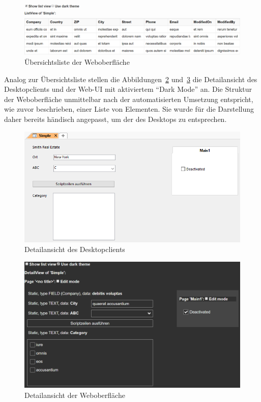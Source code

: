 \begin{figure}
    \centering
    \captionsetup{justification=centering}
    \includegraphics[width=\textwidth]{figures/listview_new.png}
        \caption{Übersichtsliste der Weboberfläche}\label{fig:listview_new}
\end{figure}

Analog zur Übersichtsliste stellen die Abbildungen~\ref{fig:detailview_crm} und~\ref{fig:detailview_new} die Detailansicht des Desktopclients und der Web-UI mit aktiviertem ``Dark Mode'' an. Die Struktur der Weboberfläche unmittelbar nach der automatisierten Umsetzung entspricht, wie zuvor beschrieben, einer Liste von Elementen. Sie wurde für die Darstellung daher bereits händisch angepasst, um der des Desktops zu entsprechen.

\begin{figure}
    \centering
    \captionsetup{justification=centering}
    \includegraphics[width=\textwidth]{figures/detailview_crm.png}
        \caption{Detailansicht des Desktopclients}\label{fig:detailview_crm}
\end{figure}

\begin{figure}
    \centering
    \captionsetup{justification=centering}
    \includegraphics[width=\textwidth]{figures/detailview_new.png}
        \caption{Detailansicht der Weboberfläche}\label{fig:detailview_new}
\end{figure}

